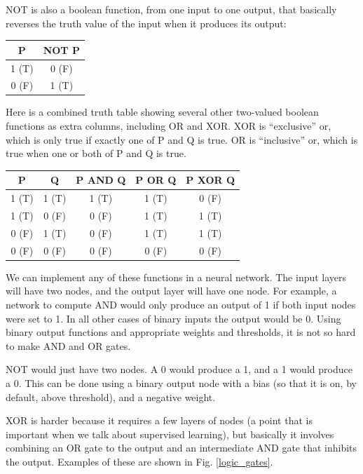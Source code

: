 NOT is also a boolean function, from one input to one output, that basically reverses the truth value of the input when it produces its output:

\begin{center}
\begin{tabular}{| c || c | }
\hline
  P  & NOT P  \\
\hline
  1 (T) & 0 (F)  \\
\hline
 0 (F) & 1 (T)  \\
\hline
\end{tabular}
\end{center}


Here is a combined truth table showing several other two-valued boolean functions as extra columns, including OR and XOR. XOR is ``exclusive'' or, which is only true if exactly one of P and Q is true. OR is ``inclusive'' or, which is true when one or both of P and Q is true.

\begin{center}
\begin{tabular}{| c | c || c || c || c | }
\hline
  P  & Q & P AND Q  & P OR Q & P XOR Q \\
\hline
  1 (T) & 1 (T) & 1 (T) & 1 (T) & 0 (F) \\
\hline
  1 (T) & 0 (F) & 0 (F) & 1 (T) & 1 (T) \\
\hline
  0 (F) & 1 (T) & 0 (F) & 1 (T) & 1 (T) \\
\hline
 0 (F) & 0 (F) & 0 (F) & 0 (F) & 0 (F) \\
\hline
\end{tabular}
\end{center}

We can implement any of these functions in a neural network. The input layers will have two nodes, and the output layer will have one node. For example, a network to compute AND would only produce an output of 1 if both input nodes were set to 1. In all other cases of binary inputs the output would be 0. Using binary output functions and appropriate weights and thresholds, it is not so hard to make AND and OR gates. 

NOT would just have two nodes. A 0 would produce a 1, and a 1 would produce a 0. This can be done using a binary output node with a bias (so that it is on, by default, above threshold), and a negative weight.

XOR is harder because it requires a few layers of nodes (a point that is important when we talk about supervised learning), but basically it involves combining an OR gate to the output and an intermediate AND gate that inhibits the output. Examples of these are shown in Fig. \ref{logic_gates}.

